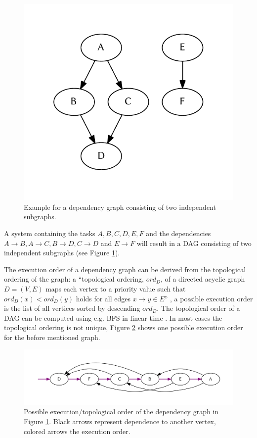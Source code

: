 		\begin{figure}[!htb]
			\centering
			\includegraphics[width=.4474\textwidth]{figures/unordered-graph.pdf} %
			\caption{\label{fig:graph:unordered} Example for a dependency graph consisting of two independent subgraphs.}
		\end{figure}
		A system containing the tasks $A, B, C, D, E, F$ and the dependencies $A\rightarrow B, A\rightarrow C, B\rightarrow D, C\rightarrow D$ and $E\rightarrow F$ will result in a \ac{DAG} consisting of two independent subgraphs (see Figure \ref{fig:graph:unordered}).

		The execution order of a dependency graph can be derived from the topological ordering of the graph: a ``topological ordering, $ord_D$, of a directed acyclic graph $D = (V, E)$ maps each vertex to a priority value such that $ord_{D}(x) < ord_{D}(y)$ holds for all edges $x \rightarrow y \in E$'' \citep{pearce2007dynamic}, a possible execution order is the list of all vertices sorted by descending $ord_D$. The topological order of a \ac{DAG} can be computed using e.g. \ac{BFS} in linear time \citep{cormen2001introduction}. In most cases the topological ordering is not unique, Figure \ref{fig:graph:ordered} shows one possible execution order for the before mentioned graph.
		\begin{figure}[!htb]
			\centering
			\includegraphics[width=1\textwidth]{figures/ordered-graph.pdf} %
			\caption{\label{fig:graph:ordered} Possible execution/topological order of the dependency graph in Figure \ref{fig:graph:unordered}. Black arrows represent dependence to another vertex, colored arrows the execution order.}
		\end{figure}

